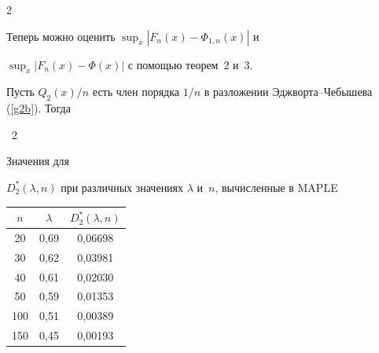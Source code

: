 \begin{multicols}{2}








Теперь можно оценить   $\sup\nolimits_x \left\vert F_n(x) - \Phi_{1,n}(x)\right\vert$ и 


$\sup\nolimits_x \left\vert F_n(x) - \Phi(x)\right\vert$ с помощью теорем~2 и~3.   





Пусть $Q_2(x)/n$ есть член порядка   $1/n$ в разложении Эджворта--Чебышева (\ref{g2b}). Тогда





\columnbreak








\noindent


\begin{center}


\parbox{56mm}{{\tablename~2}\ \ \small{Значения для 


$D_2^*(\lambda,n)$ при различных значениях  $\lambda$ и~$n$, вычисленные в    MAPLE}}







\vspace*{2ex}


\tabcolsep=15.6pt


{\small


\begin{tabular}{|c|c|c|}


\hline


$n$    & $\lambda$ & $D_2^*(\lambda,n)$\\


\hline


\hphantom{9}20   & 0,69 & 0,06698\\


\hphantom{9}30   &0,62 & 0,03981\\


\hphantom{9}40    &0,61 & 0,02030\\


\hphantom{9}50  & 0,59& 0,01353\\


100   & 0,51 & 0,00389\\


150 & 0,45 & 0,00193\\



\end{tabular}}
\end{center}
\end{multicols}
